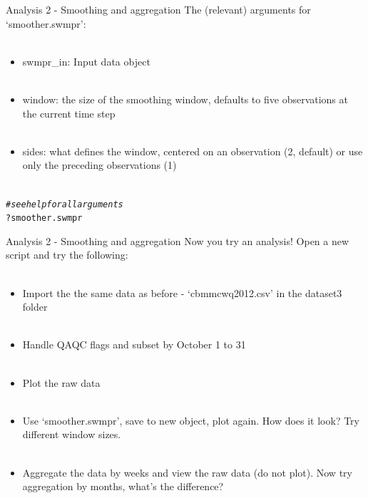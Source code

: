 \documentclass[xcolor=svgnames]{beamer}\usepackage[]{graphicx}\usepackage[]{color}
\makeatletter
\newcommand{\hlcom}[1]{\textcolor[rgb]{0.678,0.584,0.686}{\textit{#1}}}%
\newcommand{\hlopt}[1]{\textcolor[rgb]{0,0,0}{#1}}%
\newcommand{\hlstd}[1]{\textcolor[rgb]{0.345,0.345,0.345}{#1}}%
\newenvironment{kframe}{%
 \def\at@end@of@kframe{}%
 \ifinner\ifhmode%
  \def\at@end@of@kframe{\end{minipage}}%
  \begin{minipage}{\columnwidth}%
 \fi\fi%
 \def\FrameCommand##1{\hskip\@totalleftmargin \hskip-\fboxsep
 \colorbox{shadecolor}{##1}\hskip-\fboxsep
     \hskip-\linewidth \hskip-\@totalleftmargin \hskip\columnwidth}%
 \MakeFramed {\advance\hsize-\width
   \@totalleftmargin\z@ \linewidth\hsize
   \@setminipage}}%
 {\par\unskip\endMakeFramed%
 \at@end@of@kframe}
\newenvironment{knitrout}{}{} %
\makeatother
\begin{document}
\begin{frame}[containsverbatim]{Analysis 2 - Smoothing and aggregation}
The (relevant) arguments for `smoother.swmpr':\\~\\
\begin{itemize}
\item swmpr\_in: Input data object \\~\\
\item window: the size of the smoothing window, defaults to five observations at the current time step \\~\\
\item sides: what defines the window, centered on an observation (2, default) or use only the preceding observations (1)  \\~\\
\end{itemize}
\begin{knitrout}\scriptsize
{}\color{fgcolor}\begin{kframe}
\begin{alltt}
\hlcom{# see help for all arguments}
\hlopt{?}\hlstd{smoother.swmpr}
\end{alltt}
\end{kframe}
\end{knitrout}
\end{frame}

\begin{frame}[containsverbatim]{Analysis 2 - Smoothing and aggregation}
Now you try an analysis! Open a new script and try the following: \\~\\
\begin{itemize}
\item Import the the same data as before - `cbmmcwq2012.csv' in the dataset3 folder \\~\\
\item Handle QAQC flags and subset by October 1 to 31 \\~\\
\item Plot the raw data \\~\\
\item Use `smoother.swmpr', save to new object, plot again. How does it look? Try different window sizes.\\~\\
\item Aggregate the data by weeks and view the raw data (do not plot).  Now try aggregation by months, what's the difference?\\~\\
\end{itemize}
\end{frame}
\end{document}
